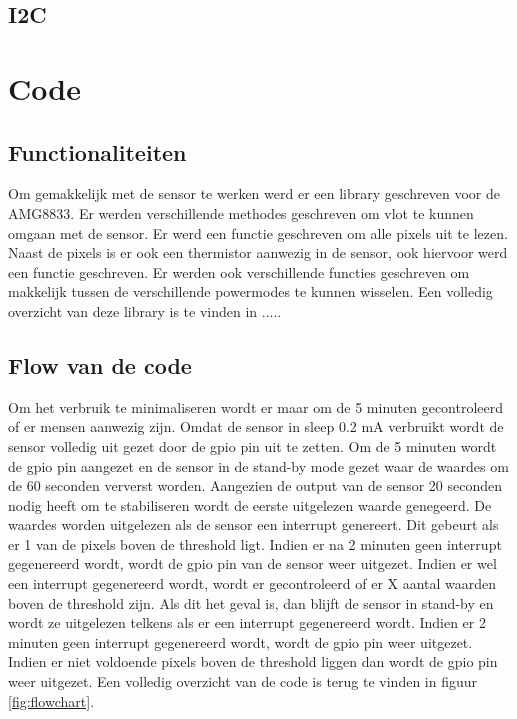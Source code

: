 \documentclass[]{article}
\begin{document}
\subsection{I2C}



\section{Code}
\subsection{Functionaliteiten}
Om gemakkelijk met de sensor te werken werd er een library geschreven voor de AMG8833. Er werden verschillende methodes geschreven om vlot te kunnen omgaan met de sensor. Er werd een functie geschreven om alle pixels uit te lezen. Naast de pixels is er ook een thermistor aanwezig in de sensor, ook hiervoor werd een functie geschreven. Er werden ook verschillende functies geschreven om makkelijk tussen de verschillende powermodes te kunnen wisselen. Een volledig overzicht van deze library is te vinden in .....

\subsection{Flow van de code}
\label{flowcode}
Om het verbruik te minimaliseren wordt er maar om de 5 minuten gecontroleerd of er mensen aanwezig zijn. Omdat de sensor in sleep 0.2 mA verbruikt wordt de sensor volledig uit gezet door de gpio pin uit te zetten. Om de 5 minuten wordt de gpio pin aangezet en de sensor in de stand-by mode gezet waar de waardes om de 60 seconden ververst worden. Aangezien de output van de sensor 20 seconden nodig heeft om te stabiliseren wordt de eerste uitgelezen waarde genegeerd. De waardes worden uitgelezen als de sensor een interrupt genereert. Dit gebeurt als er 1 van de pixels boven de threshold ligt. Indien er na 2 minuten geen interrupt gegenereerd wordt, wordt de gpio pin van de sensor weer uitgezet. Indien er wel een interrupt gegenereerd wordt, wordt er gecontroleerd of er X aantal waarden boven de threshold zijn. Als dit het geval is, dan blijft de sensor in stand-by en wordt ze uitgelezen telkens als er een interrupt gegenereerd wordt. Indien er 2 minuten geen interrupt gegenereerd wordt, wordt de gpio pin weer uitgezet. Indien er niet voldoende pixels boven de threshold liggen dan wordt de gpio pin weer uitgezet. Een volledig overzicht van de code is terug te vinden in figuur \ref{fig:flowchart}.
\end{document}
